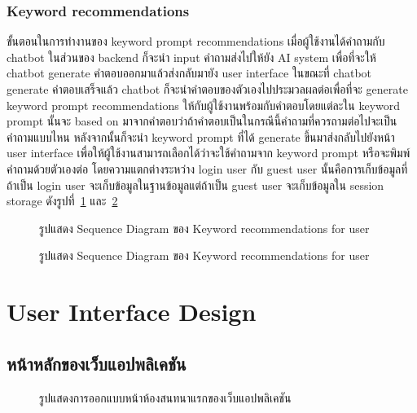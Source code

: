 \documentclass[12pt,oneside,openright,a4paper]{cpe-thai-project}
\begin{document}
\subsubsection{Keyword recommendations}

ขั้นตอนในการทำงานของ keyword prompt recommendations เมื่อผู้ใช้งานได้คำถามกับ chatbot ในส่วนของ backend ก็จะนำ input คำถามส่งไปให้ยัง AI system เพื่อที่จะให้ chatbot generate คำตอบออกมาแล้วส่งกลับมายัง user interface ในขณะที่ chatbot generate คำตอบเสร็จแล้ว chatbot ก็จะนำคำตอบของตัวเองไปประมวลผลต่อเพื่อที่จะ generate keyword prompt recommendations ให้กับผู้ใช้งานพร้อมกับคำตอบโดยแต่ละใน keyword prompt นั้นจะ based on มาจากคำตอบว่าถ้าคำตอบเป็นในกรณีนี้คำถามที่ควรถามต่อไปจะเป็นคำถามแบบไหน หลังจากนั้นก็จะนำ keyword prompt ที่ได้ generate ขึ้นมาส่งกลับไปยังหน้า user interface เพื่อให้ผู้ใช้งานสามารถเลือกได้ว่าจะใช้คำถามจาก keyword prompt หรือจะพิมพ์คำถามด้วยตัวเองต่อ โดยความแตกต่างระหว่าง login user กับ guest user นั้นคือการเก็บข้อมูลที่ถ้าเป็น login user จะเก็บข้อมูลในฐานข้อมูลแต่ถ้าเป็น guest user จะเก็บข้อมูลใน session storage ดังรูปที่~\ref{fig:F3.24} และ~\ref{fig:F3.25}\newpage

\begin{figure}[!h]\centering
\setlength{\fboxrule}{0mm}
\caption{รูปแสดง Sequence Diagram ของ Keyword recommendations for user}\label{fig:F3.24}
\end{figure}

\begin{figure}[!h]\centering
\setlength{\fboxrule}{0mm}
\caption{รูปแสดง Sequence Diagram ของ Keyword recommendations for user}\label{fig:F3.25}
\end{figure} \newpage

\section{User Interface Design}
\subsection{หน้าหลักของเว็บแอปพลิเคชัน}

\begin{figure}[!h]\centering
\setlength{\fboxrule}{0mm}
\caption{รูปแสดงการออกแบบหน้าห้องสนทนาแรกของเว็บแอปพลิเคชัน}\label{fig:F3.26}
\end{figure}
\end{document}

